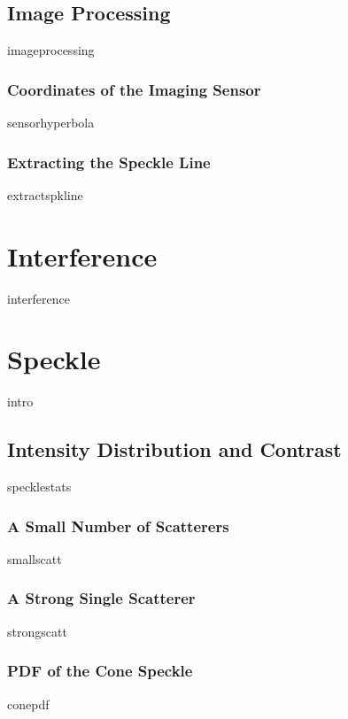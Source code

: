 \documentclass[a4paper,titlepage,onecolumn]{report}
\begin{document}
\section{Image Processing}
{imageprocessing}
\subsection{Coordinates of the Imaging Sensor}
{sensorhyperbola}
\subsection{Extracting the Speckle Line}
{extractspkline}

\chapter{Interference} \label{ch:interference}
{interference}

\chapter{Speckle} \label{ch:speckle}
{intro}
\section{Intensity Distribution and Contrast}
{specklestats}
\subsection{A Small Number of Scatterers}
{smallscatt}
\subsection{A Strong Single Scatterer}
{strongscatt}
\subsection{PDF of the Cone Speckle}
{conepdf}
\end{document}
